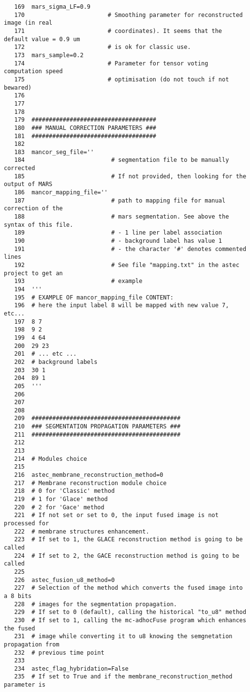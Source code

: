 \begin{verbatim}
   169	mars_sigma_LF=0.9     
   170	                      # Smoothing parameter for reconstructed image (in real
   171						  # coordinates). It seems that the default value = 0.9 um
   172						  # is ok for classic use.
   173	mars_sample=0.2       
   174	                      # Parameter for tensor voting computation speed 
   175						  # optimisation (do not touch if not bewared)
   176	
   177	
   178	
   179	####################################
   180	### MANUAL CORRECTION PARAMETERS ###
   181	####################################
   182	
   183	mancor_seg_file='' 	   
   184	                       # segmentation file to be manually corrected
   185						   # If not provided, then looking for the output of MARS
   186	mancor_mapping_file='' 
   187	                       # path to mapping file for manual correction of the 
   188						   # mars segmentation. See above the syntax of this file.
   189						   # - 1 line per label association
   190						   # - background label has value 1
   191						   # - the character '#' denotes commented lines 
   192						   # See file "mapping.txt" in the astec project to get an
   193						   # example
   194	'''
   195	# EXAMPLE OF mancor_mapping_file CONTENT:
   196	# here the input label 8 will be mapped with new value 7, etc...
   197	8 7
   198	9 2  
   199	4 64 
   200	29 23
   201	# ... etc ...
   202	# background labels
   203	30 1 
   204	89 1 
   205	'''
   206	
   207	
   208	
   209	###########################################
   210	### SEGMENTATION PROPAGATION PARAMETERS ###
   211	###########################################
   212	
   213	
   214	# Modules choice
   215	
   216	astec_membrane_reconstruction_method=0
   217	# Membrane reconstruction module choice
   218	# 0 for 'Classic' method
   219	# 1 for 'Glace' method
   220	# 2 for 'Gace' method
   221	# If not set or set to 0, the input fused image is not processed for 
   222	# membrane structures enhancement.
   223	# If set to 1, the GLACE reconstruction method is going to be called
   224	# If set to 2, the GACE reconstruction method is going to be called
   225	
   226	astec_fusion_u8_method=0
   227	# Selection of the method which converts the fused image into a 8 bits
   228	# images for the segmentation propagation. 
   229	# If set to 0 (default), calling the historical "to_u8" method
   230	# If set to 1, calling the mc-adhocFuse program which enhances the fused 
   231	# image while converting it to u8 knowing the semgnetation propagation from
   232	# previous time point
   233	
   234	astec_flag_hybridation=False
   235	# If set to True and if the membrane_reconstruction_method parameter is 

\end{verbatim}

